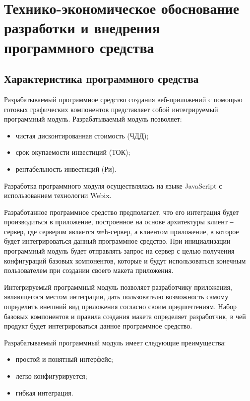 


\section{Технико-экономическое обоснование разработки и внедрения программного средства}
\label{sec:economics}

\subsection{Характеристика программного средства}
\label{sec:economics:description}

Разрабатываемый программное средство создания веб-приложений с помощью готовых графических компонентов представляет собой интегрируемый программный модуль. Разрабатываемый модуль позволяет:
\begin{itemize}
	\item чистая дисконтированная стоимость (ЧДД);
	\item срок окупаемости инвестиций (ТОК);
	\item рентабельность инвестиций (Ри).
\end{itemize}

Разработка программного модуля осуществлялась на языке JavaScript с использованием технологии Webix. 

Разработанное программное средство предполагает, что его интеграция будет производиться в приложение, построенное на основе архитектуры клиент ‒ сервер, где сервером является web-сервер, а клиентом приложение, в которое будет интегрироваться данный программное средство. При инициализации программный модуль будет отправлять запрос на сервер с целью получения конфигураций базовых компонентов, которые и будут использоваться конечным пользователем при создании своего макета приложения. 

Интегрируемый программный модуль позволяет разработчику приложения, являющегося местом интеграции, дать пользователю возможность самому определить внешний вид приложения согласно своим предпочтениям. Набор базовых компонентов и правила создания макета определяет разработчик, в чей продукт будет интегрироваться данное программное средство.

Разрабатываемый программный модуль имеет следующие
преимущества:
\begin{itemize}
	\item простой и понятный интерфейс;
	\item легко конфигурируется;
	\item гибкая интеграция.
\end{itemize}


